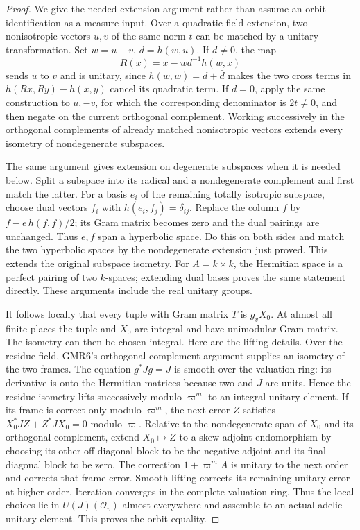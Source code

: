 \begin{proof}
We give the needed extension argument rather than assume an orbit
identification as a measure input.  Over a quadratic field extension,
two nonisotropic vectors $u,v$ of the same norm $t$ can be matched by
a unitary transformation.  Set $w=u-v$, $d=h(w,u)$.  If $d\ne0$, the
map
\[
 R(x)=x-wd^{-1}h(w,x)
 \tag{GMR.18}
\]
sends $u$ to $v$ and is unitary, since
$h(w,w)=d+\bar d$ makes the two cross terms in
$h(Rx,Ry)-h(x,y)$ cancel its quadratic term.
If $d=0$, apply the same construction to $u,-v$, for which the
corresponding denominator is $2t\ne0$, and then negate on the current
orthogonal complement.  Working successively in the orthogonal
complements of already matched nonisotropic vectors extends every
isometry of nondegenerate subspaces.

The same argument gives extension on degenerate subspaces when it is
needed below.  Split a subspace into its radical and a nondegenerate
complement and first match the latter.  For a basis $e_i$ of the
remaining totally isotropic subspace, choose dual vectors $f_i$ with
$h(e_i,f_j)=\delta_{ij}$.  Replace the column $f$ by
$f-e\,h(f,f)/2$; its Gram matrix becomes zero and the dual pairings
are unchanged.  Thus $e,f$ span a hyperbolic space.  Do this on both
sides and match the two hyperbolic spaces by the nondegenerate
extension just proved.  This extends the original subspace isometry.
For $A=k\times k$, the Hermitian space is a perfect pairing of two
$k$-spaces; extending dual bases proves the same statement directly.
These arguments include the real unitary groups.

It follows locally that every tuple with Gram matrix $T$ is $g_vX_0$.
At almost all finite places the tuple and $X_0$ are integral and have
unimodular Gram matrix.  The isometry can then be chosen integral.
Here are the lifting details.  Over the residue field, GMR6's
orthogonal-complement argument supplies an isometry of the two frames.
The equation $g^*Jg=J$ is smooth over the valuation ring: its derivative
is onto the Hermitian matrices because two and $J$ are units.  Hence
the residue isometry lifts successively modulo $\varpi^m$ to an
integral unitary element.  If its frame is correct only modulo
$\varpi^m$, the next error $Z$ satisfies
$X_0^*JZ+Z^*JX_0=0$ modulo $\varpi$.  Relative to the nondegenerate
span of $X_0$ and its orthogonal complement, extend
$X_0\mapsto Z$ to a skew-adjoint endomorphism by choosing its other
off-diagonal block to be the negative adjoint and its final diagonal
block to be zero.  The correction $1+\varpi^m A$ is unitary to the
next order and corrects that frame error.  Smooth lifting corrects its
remaining unitary error at higher order.  Iteration converges in the
complete valuation ring.  Thus the local choices lie in
$U(J)(\mathcal O_v)$ almost everywhere and assemble to an actual
adelic unitary element.  This proves the orbit equality.


\end{proof}
